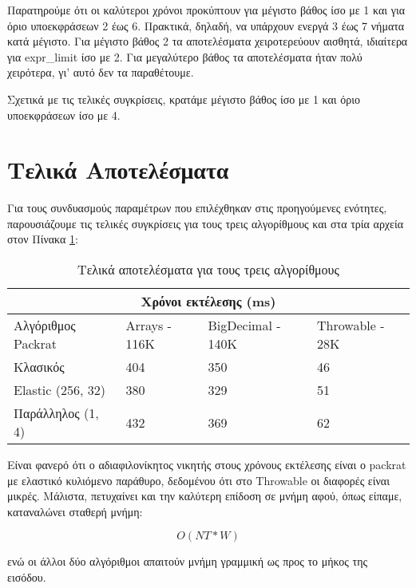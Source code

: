 Παρατηρούμε ότι οι καλύτεροι χρόνοι προκύπτουν για μέγιστο βάθος ίσο με 1 και για όριο υποεκφράσεων 2 έως 6.
Πρακτικά, δηλαδή, να υπάρχουν ενεργά 3 έως 7 νήματα κατά μέγιστο.
Για μέγιστο βάθος 2 τα αποτελέσματα χειροτερεύουν αισθητά, ιδιαίτερα για expr\_limit ίσο με 2.
Για μεγαλύτερο βάθος τα αποτελέσματα ήταν πολύ χειρότερα, γι' αυτό δεν τα παραθέτουμε.

Σχετικά με τις τελικές συγκρίσεις, κρατάμε μέγιστο βάθος ίσο με 1 και όριο υποεκφράσεων ίσο με 4.

\section{Τελικά Αποτελέσματα}

Για τους συνδυασμούς παραμέτρων που επιλέχθηκαν στις προηγούμενες ενότητες, παρουσιάζουμε τις τελικές συγκρίσεις για τους τρεις αλγορίθμους και στα τρία αρχεία στον Πίνακα \ref{table:results_final}:

\begin{table}[!ht]
\begin{tabular}{ |p{4cm}||p{3cm}|p{3cm}|p{3cm}|  }
 \hline
  \multicolumn{4}{|c|}{Χρόνοι εκτέλεσης (ms)} \\
 \hline
  Αλγόριθμος Packrat& Arrays - 116K &BigDecimal - 140K &Throwable - 28K\\
 \hline
 Κλασικός & 404 & 350 & \cellcolor{green!45}46\\
  Elastic (256, 32) & \cellcolor{green!45}380 & \cellcolor{green!45}329 & 51\\
  Παράλληλος (1, 4) & 432 & 369 & 62\\
 \hline
\end{tabular}
  \caption{Τελικά αποτελέσματα για τους τρεις αλγορίθμους}
  \label{table:results_final}
\end{table}

Είναι φανερό ότι ο αδιαφιλονίκητος νικητής στους χρόνους εκτέλεσης είναι ο packrat με ελαστικό κυλιόμενο παράθυρο, δεδομένου ότι στο Throwable οι διαφορές είναι μικρές.
Μάλιστα, πετυχαίνει και την καλύτερη επίδοση σε μνήμη αφού, όπως είπαμε, καταναλώνει σταθερή μνήμη:

\begin{equation}
  O(NT * W)
\end{equation}

ενώ οι άλλοι δύο αλγόριθμοι απαιτούν μνήμη γραμμική ως προς το μήκος της εισόδου.
